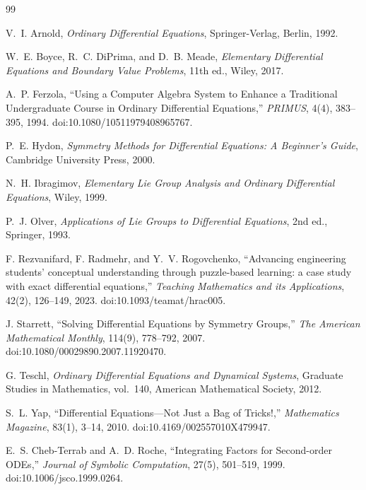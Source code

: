 \documentclass[11pt]{article}
\theoremstyle{definition}
\begin{document}
\begin{thebibliography}{99}

V.~I. Arnold,
\emph{Ordinary Differential Equations},
Springer-Verlag, Berlin, 1992.

W.~E. Boyce, R.~C. DiPrima, and D.~B. Meade,
\emph{Elementary Differential Equations and Boundary Value Problems},
11th ed., Wiley, 2017.

A.~P. Ferzola,
``Using a Computer Algebra System to Enhance a Traditional Undergraduate Course in Ordinary Differential Equations,''
\emph{PRIMUS}, 4(4), 383--395, 1994.
doi:10.1080/10511979408965767.

P.~E. Hydon,
\emph{Symmetry Methods for Differential Equations: A Beginner's Guide},
Cambridge University Press, 2000.

N.~H. Ibragimov,
\emph{Elementary Lie Group Analysis and Ordinary Differential Equations},
Wiley, 1999.

P.~J. Olver,
\emph{Applications of Lie Groups to Differential Equations},
2nd ed., Springer, 1993.

F. Rezvanifard, F. Radmehr, and Y.~V. Rogovchenko,
``Advancing engineering students' conceptual understanding through
puzzle-based learning: a case study with exact differential equations,''
\emph{Teaching Mathematics and its Applications}, 42(2), 126--149, 2023.
doi:10.1093/teamat/hrac005.

J. Starrett,
``Solving Differential Equations by Symmetry Groups,''
\emph{The American Mathematical Monthly}, 114(9), 778--792, 2007.
doi:10.1080/00029890.2007.11920470.

G. Teschl,
\emph{Ordinary Differential Equations and Dynamical Systems},
Graduate Studies in Mathematics, vol.~140,
American Mathematical Society, 2012.

S.~L. Yap,
``Differential Equations---Not Just a Bag of Tricks!,''
\emph{Mathematics Magazine}, 83(1), 3--14, 2010.
doi:10.4169/002557010X479947.

E.~S. Cheb-Terrab and A.~D. Roche,
``Integrating Factors for Second-order ODEs,''
\emph{Journal of Symbolic Computation}, 27(5), 501--519, 1999.
doi:10.1006/jsco.1999.0264.

\end{thebibliography}
\end{document}
